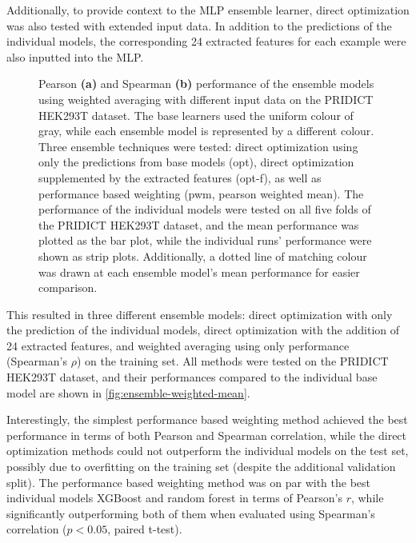 Additionally, to provide context to the MLP ensemble learner, direct optimization was also tested with extended input data. In addition to the predictions of the individual models, the corresponding 24 extracted features for each example were also inputted into the MLP. 

\begin{figure}
    \caption[Ensemble Model Performance]{Pearson \textbf{(a)} and Spearman \textbf{(b)} performance of the ensemble models using weighted averaging with different input data on the PRIDICT HEK293T dataset. The base learners used the uniform colour of gray, while each ensemble model is represented by a different colour. Three ensemble techniques were tested: direct optimization using only the predictions from base models (opt), direct optimization supplemented by the extracted features (opt-f), as well as performance based weighting (pwm, pearson weighted mean). The performance of the individual models were tested on all five folds of the PRIDICT HEK293T dataset, and the mean performance was plotted as the bar plot, while the individual runs' performance were shown as strip plots. Additionally, a dotted line of matching colour was drawn at each ensemble model's mean performance for easier comparison. }
    \label{fig:ensemble-weighted-mean}
\end{figure}

This resulted in three different ensemble models: direct optimization with only the prediction of the individual models, direct optimization with the addition of 24 extracted features, and weighted averaging using only performance (Spearman's $\rho$) on the training set. All methods were tested on the PRIDICT HEK293T dataset, and their performances compared to the individual base model are shown in \autoref{fig:ensemble-weighted-mean}.

Interestingly, the simplest performance based weighting method achieved the best performance in terms of both Pearson and Spearman correlation, while the direct optimization methods could not outperform the individual models on the test set, possibly due to overfitting on the training set (despite the additional validation split). The performance based weighting method was on par with the best individual models XGBoost and random forest in terms of Pearson's $r$, while significantly outperforming both of them when evaluated using Spearman's correlation ($p<0.05$, paired t-test). 

